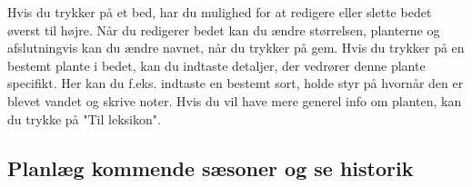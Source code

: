 \begin{minipage}{0.5\textwidth}
Hvis du trykker på et bed, har du mulighed for at redigere eller slette bedet øverst til højre. Når du redigerer bedet kan du ændre størrelsen, planterne og afslutningvis kan du ændre navnet, når du trykker på gem. Hvis du trykker på en bestemt plante i bedet, kan du indtaste detaljer, der vedrører denne plante specifikt. Her kan du f.eks. indtaste en bestemt sort, holde styr på hvornår den er blevet vandet og skrive noter. Hvis du vil have mere generel info om planten, kan du trykke på "Til leksikon".
\end{minipage}

\subsection{Planlæg kommende sæsoner og se historik}

